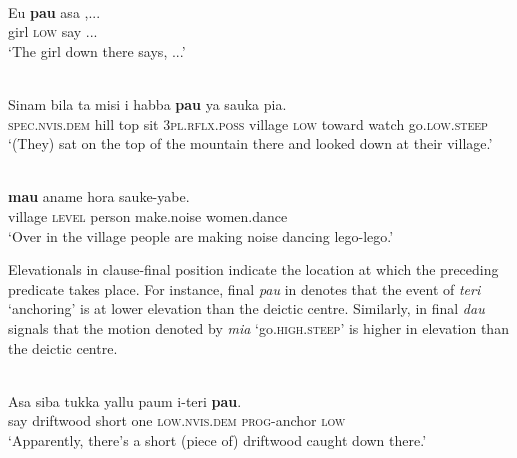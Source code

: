  



\ea%
\label{ex:7:33}
 \\
\gll   Eu  \textbf{pau} asa{\ng} ,...\\
   girl  \textsc{low} say ... \\
\glt   `The girl down there says, ...' 
\z









\ea%
\label{ex:7:34}
 \\
\gll  Sinam   bila    ta{\ng}    misi{\ng}  i  habba{\ng} \textbf{pau}   ya     sauka{\ng}  pia. \\
    \textsc{spec.nvis.dem} hill  top  sit  \textsc{3pl.rflx.poss} village  \textsc{low}   toward  watch  go\textsc{.low.steep} \\
\glt   `(They) sat on the top of the mountain there and looked down at their village.'
\z

\ea%
\label{ex:7:35}
 \\
 \textbf{mau} aname  hora{\ng}  sauke-yabe.\\
  village  \textsc{level} person  make.noise  women.dance \\
\glt  `Over in the village people are making noise dancing lego-lego.' 
\z


Elevationals in clause-final position indicate the location at which the preceding predicate takes place. For instance, final \textit{pau} in  denotes that the event of \textit{teri} `anchoring' is at lower elevation than the deictic centre. Similarly, in  final \textit{dau} signals that the motion denoted by \textit{mia} `go.\textsc{high.steep}' is higher in elevation than the deictic centre. 



\ea%
\label{ex:7:36}
 \\
\gll  Asa{\ng}  siba{\ng}  tukka  yallu  paum  i-teri \textbf{pau}.\\
  say  driftwood  short  one  \textsc{low.nvis.dem} \textsc{prog}{}-anchor  \textsc{low} \\
\glt  `Apparently, there's a short (piece of) driftwood caught down there.'
\z
     

